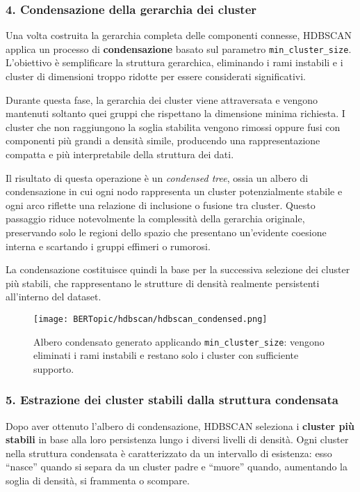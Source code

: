 \subsubsection*{4. Condensazione della gerarchia dei cluster}

Una volta costruita la gerarchia completa delle componenti connesse, HDBSCAN applica un processo di \textbf{condensazione} basato sul parametro \texttt{min\_cluster\_size}. 
L'obiettivo è semplificare la struttura gerarchica, eliminando i rami instabili e i cluster di dimensioni troppo ridotte per essere considerati significativi.

Durante questa fase, la gerarchia dei cluster viene attraversata e vengono mantenuti soltanto quei gruppi che rispettano la dimensione minima richiesta. 
I cluster che non raggiungono la soglia stabilita vengono rimossi oppure fusi con componenti più grandi a densità simile, producendo una rappresentazione compatta e più interpretabile della struttura dei dati.

Il risultato di questa operazione è un \textit{condensed tree}, ossia un albero di condensazione in cui ogni nodo rappresenta un cluster potenzialmente stabile e ogni arco riflette una relazione di inclusione o fusione tra cluster. 
Questo passaggio riduce notevolmente la complessità della gerarchia originale, preservando solo le regioni dello spazio che presentano un'evidente coesione interna e scartando i gruppi effimeri o rumorosi.

La condensazione costituisce quindi la base per la successiva selezione dei cluster più stabili, che rappresentano le strutture di densità realmente persistenti all'interno del dataset.

\begin{figure}[H]
\centering
\texttt{[image: BERTopic/hdbscan/hdbscan\_condensed.png]}
\caption{Albero condensato generato applicando \texttt{min\_cluster\_size}: vengono eliminati i rami instabili e restano solo i cluster con sufficiente supporto.}
\label{fig:hdbscan-condensed}
\end{figure}

\subsubsection*{5. Estrazione dei cluster stabili dalla struttura condensata}

Dopo aver ottenuto l'albero di condensazione, HDBSCAN seleziona i \textbf{cluster più stabili} in base alla loro persistenza lungo i diversi livelli di densità. 
Ogni cluster nella struttura condensata è caratterizzato da un intervallo di esistenza: esso ``nasce'' quando si separa da un cluster padre e ``muore'' quando, aumentando la soglia di densità, si frammenta o scompare.

